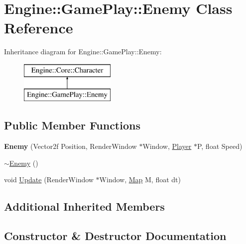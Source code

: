 \hypertarget{class_engine_1_1_game_play_1_1_enemy}{}\section{Engine\+:\+:Game\+Play\+:\+:Enemy Class Reference}
\label{class_engine_1_1_game_play_1_1_enemy}
Inheritance diagram for Engine\+:\+:Game\+Play\+:\+:Enemy\+:\begin{figure}[H]
\begin{center}
\leavevmode
\includegraphics[height=2.000000cm]{class_engine_1_1_game_play_1_1_enemy}
\end{center}
\end{figure}
\subsection*{Public Member Functions}
\begin{DoxyCompactItemize}
\item 
\mbox{\label{class_engine_1_1_game_play_1_1_enemy_aecd83da9f05f6d81d512e56f0f16b1d2}} 
{\bfseries Enemy} (Vector2f Position, Render\+Window $\ast$Window, \hyperlink{class_engine_1_1_game_play_1_1_player}{Player} $\ast$P, float Speed)
\item 
\hyperlink{class_engine_1_1_game_play_1_1_enemy_a4fc3aafb331e8cf852ea31bcc63940ff}{$\sim$\+Enemy} ()
\item 
void \hyperlink{class_engine_1_1_game_play_1_1_enemy_abc8825ecfc278a6308e8e8bd523cb03f}{Update} (Render\+Window $\ast$Window, \hyperlink{class_engine_1_1_core_1_1_map}{Map} M, float dt)
\end{DoxyCompactItemize}
\subsection*{Additional Inherited Members}


\subsection{Constructor \& Destructor Documentation}
\mbox{\label{class_engine_1_1_game_play_1_1_enemy_a4fc3aafb331e8cf852ea31bcc63940ff}} 
